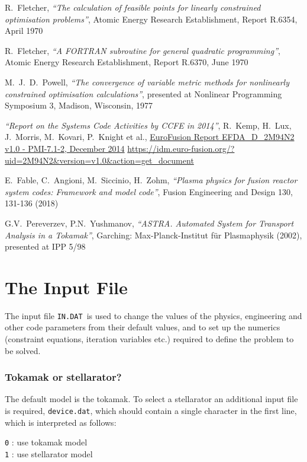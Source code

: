 \documentclass[11pt,a4paper]{report}
\newcommand{\indat}{\mbox{\texttt{IN.DAT}}}
\newcommand{\setheader}[1]
 {\markright{\rlap{\lower0.8ex\hbox to\textwidth{\hrulefill}}{\bf#1}}}
\newcommand{\myappendix}[1]{\small\normalsize
 \setcounter{footnote}{0}
 \chapter{#1}
 \pagestyle{myheadings}
 \setheader{Appendix \thechapter\hspace{0.8em}#1}}
\begin{document}
\begin{thebibliography}{99}
R.\ Fletcher,
\textit{``The calculation of feasible points for linearly constrained
  optimisation problems''},
Atomic Energy Research Establishment, Report R.6354, April 1970

R.\ Fletcher,
\textit{``A FORTRAN subroutine for general quadratic programming''},
Atomic Energy Research Establishment, Report R.6370, June 1970

M.\ J.\ D.\ Powell,
\textit{``The convergence of variable metric methods for nonlinearly
  constrained optimisation calculations''},
presented at Nonlinear Programming Symposium 3, Madison, Wisconsin, 1977

\textit{``Report on the Systems Code Activities by CCFE in 2014''},
R.\ Kemp, H.\ Lux, J.\ Morris, M.\ Kovari, P.\ Knight et al.,
\href{https://idm.euro-fusion.org/?uid=2M94N2\&version=v1.0\&action=get\_document}
{EuroFusion Report EFDA\_D\_2M94N2 v1.0 - PMI-7.1-2, December 2014}
\url{https://idm.euro-fusion.org/?uid=2M94N2\&version=v1.0\&action=get\_document}

E.\ Fable, C.\ Angioni, M.\ Siccinio, H.\ Zohm,
\textit{``Plasma physics for fusion reactor system codes: Framework and model code''},
Fusion Engineering and Design 130, 131-136 (2018)

G.V.\ Pereverzev, P.N.\ Yushmanov,
\textit{``ASTRA. Automated System for Transport Analysis in a Tokamak''},
Garching: Max-Planck-Institut für Plasmaphysik (2002), presented at IPP 5/98 

\end{thebibliography}

\myappendix{The Input File}
\label{app:infile}

The input file \indat\ is used to change the values of the physics,
engineering and other code parameters from their default values, and to set up
the numerics (constraint equations, iteration variables etc.) required to
define the problem to be solved.

\subsection{Tokamak or stellarator?}
\label{sec:device}

The default model is the tokamak.  To select a stellarator an additional input file is required, \texttt{device.dat}, which should contain a single character in the first
line, which is interpreted as follows:
\begin{tabbing}
\hspace{15mm}\= \texttt{0} : use tokamak model \\
\> \texttt{1} : use stellarator model \\
\end{tabbing}
\end{document}
